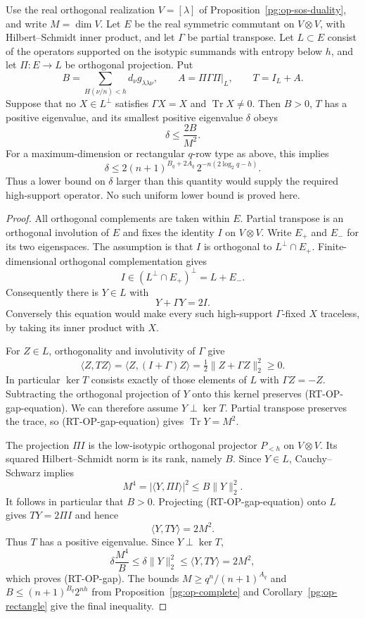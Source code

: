 \begin{proposition}
\label{rt:op-gap}
Use the real orthogonal realization $V=[\lambda]$ of
Proposition~\ref{pg:op-sos-duality}, and write $M=\dim V$.
Let $E$ be the real symmetric commutant on $V\otimes V$, with
Hilbert--Schmidt inner product, and let $\Gamma$ be partial transpose.
Let $L\subset E$ consist of the operators supported on the isotypic
summands with entropy below $h$, and let $\Pi:E\to L$ be orthogonal
projection. Put
\[
 B=\sum_{H(\nu/n)<h}d_\nu g_{\lambda\lambda\nu},\qquad
 A=\Pi\Gamma\Pi\big|_L,\qquad T=I_L+A.
 \tag{RT-OP-gap-data}
\]
Suppose that no $X\in L^\perp$ satisfies $\Gamma X=X$ and
$\operatorname{Tr}X\ne0$. Then $B>0$, $T$ has a positive eigenvalue,
and its smallest positive eigenvalue $\delta$ obeys
\[
 \delta\leq\frac{2B}{M^2}.
 \tag{RT-OP-gap}
\]
For a maximum-dimension or rectangular $q$-row type as above, this
implies
\[
 \delta\leq
 2(n+1)^{B_q+2A_q}\,2^{-n(2\log_2q-h)}.
 \tag{RT-OP-gap-asymptotic}
\]
Thus a lower bound on $\delta$ larger than this quantity would supply
the required high-support operator. No such uniform lower bound is
proved here.
\end{proposition}
\begin{proof}
All orthogonal complements are taken within $E$. Partial transpose
is an orthogonal involution of $E$ and fixes the identity $I$ on
$V\otimes V$. Write $E_+$ and $E_-$ for its two eigenspaces.
The assumption is that $I$ is orthogonal to $L^\perp\cap E_+$.
Finite-dimensional orthogonal complementation gives
\[
 I\in (L^\perp\cap E_+)^\perp=L+E_-.
\]
Consequently there is $Y\in L$ with
\[
 Y+\Gamma Y=2I.
 \tag{RT-OP-gap-equation}
\]
Conversely this equation would make every such high-support
$\Gamma$-fixed $X$ traceless, by taking its inner product with $X$.

For $Z\in L$, orthogonality and involutivity of $\Gamma$ give
\[
 \langle Z,TZ\rangle
 =\langle Z,(I+\Gamma)Z\rangle
 =\tfrac12\|Z+\Gamma Z\|_2^2\geq0.
\]
In particular $\ker T$ consists exactly of those elements of $L$
with $\Gamma Z=-Z$. Subtracting the orthogonal projection of $Y$
onto this kernel preserves (RT-OP-gap-equation). We can therefore
assume $Y\perp\ker T$. Partial transpose preserves the trace, so
(RT-OP-gap-equation) gives $\operatorname{Tr}Y=M^2$.

The projection $\Pi I$ is the low-isotypic orthogonal projector
$P_{<h}$ on $V\otimes V$. Its squared Hilbert--Schmidt norm is its
rank, namely $B$. Since $Y\in L$, Cauchy--Schwarz implies
\[
 M^4=|\langle Y,\Pi I\rangle|^2
       \leq B\|Y\|_2^2.
\]
It follows in particular that $B>0$. Projecting
(RT-OP-gap-equation) onto $L$ gives $TY=2\Pi I$ and hence
\[
 \langle Y,TY\rangle=2M^2.
\]
Thus $T$ has a positive eigenvalue. Since $Y\perp\ker T$,
\[
 \delta\frac{M^4}{B}
 \leq\delta\|Y\|_2^2
 \leq\langle Y,TY\rangle=2M^2,
\]
which proves (RT-OP-gap). The bounds
$M\geq q^n/(n+1)^{A_q}$ and
$B\leq(n+1)^{B_q}2^{nh}$ from
Proposition~\ref{pg:op-complete} and
Corollary~\ref{pg:op-rectangle} give the final inequality.
\end{proof}

